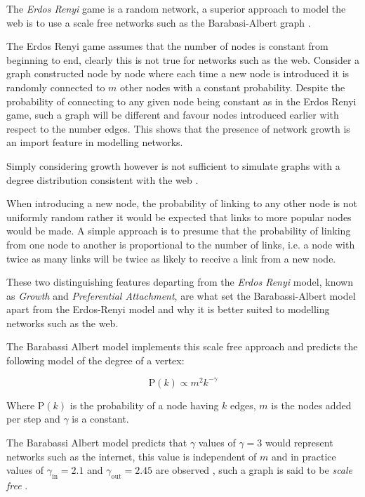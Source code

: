 \documentclass[11pt]{report}
\begin{document}
The \emph{Erdos Renyi} game is a random network, a superior approach to model the web
is to use a scale free networks \cite{barabasiPhysicsWeb2001} such as the
Barabasi-Albert graph \cite{barabasiScalefreeCharacteristicsRandom2000}.


The Erdos Renyi game assumes that the number of nodes is constant from beginning
to end, clearly this is not true for networks such as the web. Consider a graph
constructed node by node where each time a new node is introduced it is randomly
connected to \(m\) other nodes with a constant probability. Despite the probability of
connecting to any given node being constant as in the Erdos Renyi game, such a
graph will be different and favour nodes introduced earlier with respect to the number edges.
This shows that the presence of network growth is an import feature in modelling
networks.

Simply considering growth however is not sufficient to simulate graphs with a
degree distribution consistent with the web
\cite[Ch. 7]{zengPracticalSimulationMethod2013}.

When introducing a new node, the probability of linking to any other node is not
uniformly random rather it would be
expected that links to more popular nodes would be made. A simple approach is to presume that the probability of linking from
one node to another is proportional to the number of links, i.e. a node with
twice as many links will be twice as likely to receive a link from a new node.

These two distinguishing features departing from the \emph{Erdos Renyi} model, known as \emph{Growth} and \emph{Preferential Attachment}, are what set the Barabassi-Albert model apart from the Erdos-Renyi model and why it is better suited to modelling networks such as the web. \cite[Ch. 7]{barabasiLinkedNewScience2002}




The Barabassi Albert model implements this scale free approach and predicts the following model of the degree of a vertex:

\[
\mathrm{P}\left(k\right) \propto m^2 k^{-\gamma}
\]


Where \(\mathrm{P}\left(k\right)\) is the probability of a node having \(k\) edges, \(m\) is the nodes added per step and \(\gamma\) is a constant.

The Barabassi Albert model predicts that \(\gamma\) values of \(\gamma=3\) would
represent networks such as the internet, this value is independent of \(m\) and
in practice values of \(\gamma_{\mathrm{in}}= 2.1\) and
\(\gamma_{\mathrm{out}} = 2.45\) are observed
\cite[]{barabasiScalefreeCharacteristicsRandom2000}, such a graph is said to be
\textit{scale free} \cite[.2]{langvilleGooglePageRankScience2012}.
\end{document}
